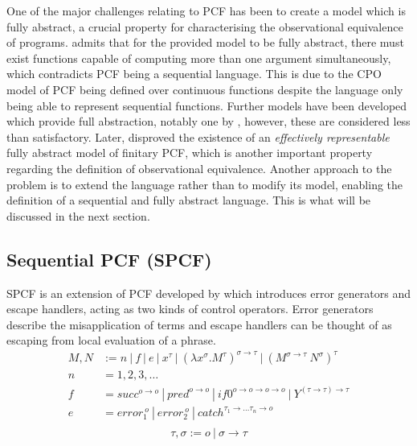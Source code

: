 \documentclass[12pt,a4paper]{report}
\theoremstyle{definition}
\theoremstyle{definition}
\theoremstyle{remark}
\begin{document}
One of the major challenges relating to PCF has been to create a model which is fully abstract, a crucial property for characterising the observational equivalence of programs. \cite{plotkin_1977} admits that for the provided model to be fully abstract, there must exist functions capable of computing more than one argument simultaneously, which contradicts PCF being a sequential language. This is due to the CPO model of PCF being defined over continuous functions despite the language only being able to represent sequential functions. Further models have been developed which provide full abstraction, notably one by \cite{milner_1977}, however, these are considered less than satisfactory. Later, \cite{loader_1996} disproved the existence of an \textit{effectively representable} fully abstract model of finitary PCF, which is another important property regarding the definition of observational equivalence. Another approach to the problem is to extend the language rather than to modify its model, enabling the definition of a sequential and fully abstract language. This is what will be discussed in the next section.

\subsection{Sequential PCF (SPCF)}\label{sec:spcf}
SPCF is an extension of PCF developed by \cite{cartwright_1992} which introduces error generators and escape handlers, acting as two kinds of control operators. Error generators describe the misapplication of terms and escape handlers can be thought of as escaping from local evaluation of a phrase.
\begin{equation} \label{eq:spcf_grammar}
\begin{split}
    M,N &:= n\ |\ f\ |\ e\ |\ x^{\tau}\ |\ (\lambda x^{\sigma} .M^{\tau})^{\sigma \rightarrow \tau}\ |\ (M^{\sigma \rightarrow \tau} \ N^{\sigma})^{\tau}\\
    n &= 1, 2, 3, \dots\\
    f &= succ^{o \rightarrow o} \ | \ pred^{o \rightarrow o} \ | \ if0^{o \rightarrow o \rightarrow o \rightarrow o} \ | \ Y^{(\tau \rightarrow \tau) \rightarrow \tau}\\
    e &= error_1^{\ o}\ |\ error_{2}^{\ o}\ |\ catch^{\tau_1 \rightarrow \dots \tau_n \rightarrow o}\\
\end{split}
\end{equation}
\begin{equation}
    \tau , \sigma := o\ |\ \sigma \rightarrow \tau
\end{equation}
\end{document}
